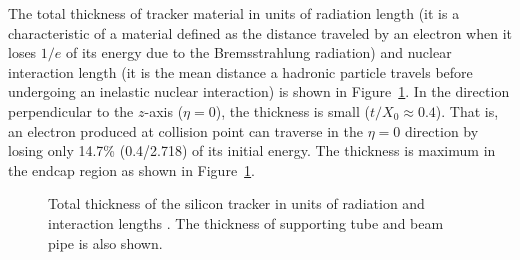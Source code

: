 The total thickness of tracker material in units of radiation length (it is a characteristic 
of a material defined as the distance traveled by an electron when it
loses $1/e$ of its energy due to the Bremsstrahlung radiation) and nuclear interaction length
(it is the mean distance a hadronic particle travels before undergoing an inelastic
nuclear interaction) is shown in Figure~\ref{fig:cms_track_budget}. In the direction
perpendicular to the $z$-axis ($\eta = 0$), the thickness is small ($t/X_0 \approx 0.4$).
That is, an electron produced at collision point can traverse in the $\eta = 0$ 
direction by losing only 14.7\% (0.4/2.718) of its initial energy. The thickness is 
maximum in the endcap region as shown in Figure~\ref{fig:cms_track_budget}.
\begin{figure}
  \centering
  \hfil
  \caption{Total thickness of the silicon tracker in units of radiation and interaction 
	lengths \cite{Chatrchyan:2014fea}. The thickness of supporting tube and beam 
	pipe is also shown.}
  \label{fig:cms_track_budget}
\end{figure}

